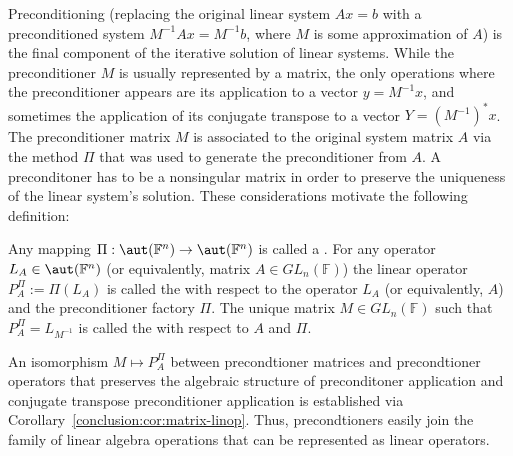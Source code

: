 Preconditioning (replacing the original linear system $Ax = b$ with a
preconditioned system $M^{-1}Ax = M^{-1}b$, where $M$ is some approximation of
$A$) is the final component of the iterative solution of linear systems. While
the preconditioner $M$ is usually represented by a matrix, the only operations
where the preconditioner appears are its application to a vector $y = M^{-1}x$,
and sometimes the application of its conjugate transpose to a vector $Y =
(M^{-1})^*x$. The preconditioner matrix $M$ is associated to the original system
matrix $A$ via the method $\Pi$ that was used to generate the preconditioner
from $A$. A preconditoner has to be a nonsingular matrix in order to preserve
the uniqueness of the linear system's solution. These considerations motivate
the following definition:

\begin{definition}
\label{conclusion:def:precond-linop}
Any mapping $\Pi : \aut(\mathbb{F}^n) \rightarrow \aut(\mathbb{F}^n)$ is called
a . For any operator $L_A \in
\aut(\mathbb{F}^n)$ (or equivalently, matrix $A \in GL_n(\mathbb{F})$) the
linear operator $P_A^\Pi := \Pi(L_A)$ is called the  with respect to the operator $L_A$ (or equivalently, $A$) and the
preconditioner factory $\Pi$.  The unique matrix $M \in GL_n(\mathbb{F})$ such
that $P_A^\Pi = L_{M^{-1}}$ is called the  with
respect to $A$ and $\Pi$.
\end{definition}

An isomorphism $M \mapsto P_A^\Pi$ between precondtioner matrices and
precondtioner operators that preserves the algebraic structure of preconditoner
application and conjugate transpose preconditioner application is established
via Corollary~\ref{conclusion:cor:matrix-linop}. Thus, precondtioners easily
join the family of linear algebra operations that can be represented as linear
operators.


